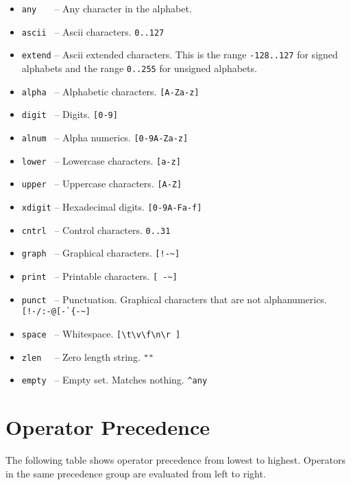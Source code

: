 \documentclass[letterpaper,11pt,oneside]{book}
\begin{document}
\begin{itemize}
\begin{itemize}
\item \verb|any   | -- Any character in the alphabet.

\item \verb|ascii | -- Ascii characters. \verb|0..127|

\item \verb|extend| -- Ascii extended characters. This is the range
\verb|-128..127| for signed alphabets and the range \verb|0..255| for unsigned
alphabets.

\item \verb|alpha | -- Alphabetic characters. \verb|[A-Za-z]|

\item \verb|digit | -- Digits. \verb|[0-9]|

\item \verb|alnum | -- Alpha numerics. \verb|[0-9A-Za-z]|

\item \verb|lower | -- Lowercase characters. \verb|[a-z]|

\item \verb|upper | -- Uppercase characters. \verb|[A-Z]|

\item \verb|xdigit| -- Hexadecimal digits. \verb|[0-9A-Fa-f]|

\item \verb|cntrl | -- Control characters. \verb|0..31|

\item \verb|graph | -- Graphical characters. \verb|[!-~]|

\item \verb|print | -- Printable characters. \verb|[ -~]|

\item \verb|punct | -- Punctuation. Graphical characters that are not alphanumerics.
\verb|[!-/:-@[-`{-~]|

\item \verb|space | -- Whitespace. \verb|[\t\v\f\n\r ]|

\item \verb|zlen  | -- Zero length string. \verb|""|

\item \verb|empty | -- Empty set. Matches nothing. \verb|^any|

\end{itemize}
\end{itemize}

\section{Operator Precedence}
The following table shows operator precedence from lowest to highest. Operators
in the same precedence group are evaluated from left to right.
\end{document}
